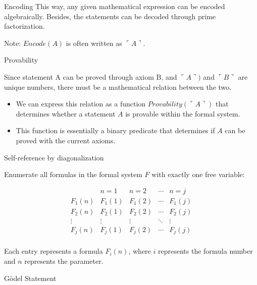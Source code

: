 \documentclass[final]{beamer}
\newlength{\colwidth}
\begin{document}
\begin{frame}[t]
\begin{columns}[t]
\begin{column}{\colwidth}
\begin{block}{Encoding}
    This way, any given mathematical expression can be encoded algebraically. Besides, the statements can be decoded through prime factorization.

    Note: $Encode(A)$ is often written as $\ulcorner \!A \urcorner$.

  \end{block}

 \begin{block}{Provability}

Since statement A can be proved through axiom B, and $\ulcorner \!A \urcorner)$ and $\ulcorner \!B \urcorner$ are unique numbers, there must be a mathematical relation between the two.

 \begin{itemize}
    
    \item We can express this relation as a function $Provability(\ulcorner \!A \urcorner)$ that determines whether a statement $A$ is provable within the formal system.
    
    \item This function is essentially a binary predicate that determines if $A$ can be proved with the current axioms.
    
    \end{itemize}

 \end{block}


 \begin{block}{Self-reference by diagonalization}

    Enumerate all formulas in the formal system $F$ with exactly one free variable:
    
    \[
    \begin{array}{c|c|c|c|c}
    & n=1 & n=2 & \cdots & n = j \\
    \hline
    F_1(n) & F_1(1) & F_1(2) & \cdots & F_1(j) \\
    F_2(n) & F_2(1) & F_2(2) & \cdots & F_2(j) \\
    \vdots & \vdots & \vdots & \ddots & \vdots \\
    F_j(n) & F_j(1) & F_j(2) & \cdots & F_j(j) \\
    \end{array}
    \]


Each entry represents a formula \( F_i(n) \), where \( i \) represents the formula number and \( n \) represents the parameter.
\end{block}

\begin{block}{Gödel Statement}


\end{block}
\end{column}
\end{columns}
\end{frame}
\end{document}
